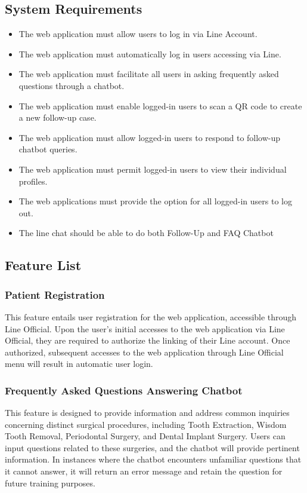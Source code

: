 \documentclass[12pt,oneside,openright,a4paper]{cpe-english-project}
\begin{document}
    \subsection{System Requirements}
    \begin{itemize}
      \item The web application must allow users to log in via Line Account.
      \item The web application must automatically log in users accessing via Line.
      \item The web application must facilitate all users in asking frequently asked questions through a chatbot.
      \item The web application must enable logged-in users to scan a QR code to create a new follow-up case.
      \item The web application must allow logged-in users to respond to follow-up chatbot queries.
      \item The web application must permit logged-in users to view their individual profiles.
      \item The web applications must provide the option for all logged-in users to log out.
      \item The line chat should be able to do both Follow-Up and FAQ Chatbot
    \end{itemize}

    \subsection{Feature List}
      \subsubsection{Patient Registration}
      \qquad This feature entails user registration for the web application, accessible through Line Official. Upon the user’s initial accesses to the web application via Line Official, they are required to authorize the linking of their Line account. Once authorized, subsequent accesses to the web application through Line Official menu will result in automatic user login. \par
      \subsubsection{Frequently Asked Questions Answering Chatbot}
      \qquad This feature is designed to provide information and address common inquiries concerning distinct surgical procedures, including Tooth Extraction, Wisdom Tooth Removal, Periodontal Surgery, and Dental Implant Surgery. Users can input questions related to these surgeries, and the chatbot will provide pertinent information. In instances where the chatbot encounters unfamiliar questions that it cannot answer, it will return an error message and retain the question for future training purposes. \par
\end{document}
